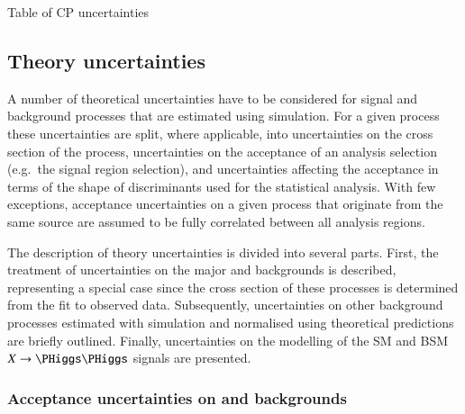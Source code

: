 \begin{table}[htbp]
  \centering

  

  \caption{Table of CP uncertainties}
  \label{tab:bla}
\end{table}




\subsection{Theory uncertainties}%
\label{sec:modelling_uncertainties}%
\label{sec:theory_uncertainties}

A number of theoretical uncertainties have to be considered for signal
and background processes that are estimated using simulation. For a
given process these uncertainties are split, where applicable, into
uncertainties on the cross section of the process, uncertainties on
the acceptance of an analysis selection (e.g.\ the signal region
selection), and uncertainties affecting the acceptance in terms of the
shape of discriminants used for the statistical analysis. With few
exceptions, acceptance uncertainties on a given process that originate
from the same source are assumed to be fully correlated between all
analysis regions.

The description of theory uncertainties is divided into several parts.
First, the treatment of uncertainties on the major \ZHF and \ttbar
backgrounds is described, representing a special case since the cross
section of these processes is determined from the fit to observed
data. Subsequently, uncertainties on other background processes
estimated with simulation and normalised using theoretical predictions
are briefly outlined. Finally, uncertainties on the modelling of the
SM \HH and BSM $X \to \HH$ signals are presented.

\subsubsection{Acceptance uncertainties on \ZHF and \ttbar backgrounds}

